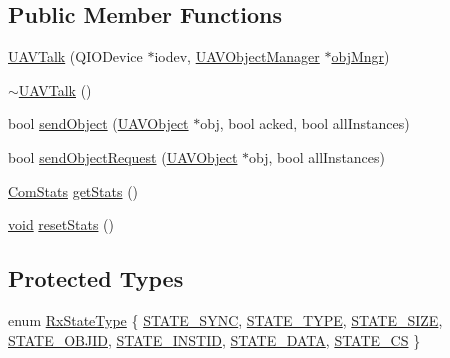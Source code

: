 \subsection*{\-Public \-Member \-Functions}
\begin{DoxyCompactItemize}
\item 
\hyperlink{group___u_a_v_talk_plugin_ga53c36c64288a62b44a285dfb40cee946}{\-U\-A\-V\-Talk} (\-Q\-I\-O\-Device $\ast$iodev, \hyperlink{class_u_a_v_object_manager}{\-U\-A\-V\-Object\-Manager} $\ast$\hyperlink{group___u_a_v_talk_plugin_ga096422f1ff46ea45de07a92c41827aa5}{obj\-Mngr})
\item 
\hyperlink{group___u_a_v_talk_plugin_ga1c6de05403ed728008c21592d142375e}{$\sim$\-U\-A\-V\-Talk} ()
\item 
bool \hyperlink{group___u_a_v_talk_plugin_gafb99b5df957808785013366dfd5bc636}{send\-Object} (\hyperlink{class_u_a_v_object}{\-U\-A\-V\-Object} $\ast$obj, bool acked, bool all\-Instances)
\item 
bool \hyperlink{group___u_a_v_talk_plugin_ga884c8680ea2c95bef75fca2c4c95867d}{send\-Object\-Request} (\hyperlink{class_u_a_v_object}{\-U\-A\-V\-Object} $\ast$obj, bool all\-Instances)
\item 
\hyperlink{struct_u_a_v_talk_1_1_com_stats}{\-Com\-Stats} \hyperlink{group___u_a_v_talk_plugin_gac9f7d49b556190b1b7d4b845b8b23a34}{get\-Stats} ()
\item 
\hyperlink{group___u_a_v_objects_plugin_ga444cf2ff3f0ecbe028adce838d373f5c}{void} \hyperlink{group___u_a_v_talk_plugin_gaba16247e0963a29b16a6177e685f1321}{reset\-Stats} ()
\end{DoxyCompactItemize}
\subsection*{\-Protected \-Types}
\begin{DoxyCompactItemize}
\item 
enum \hyperlink{group___u_a_v_talk_plugin_ga7f7ca2a64b0ea5ec26fb64d06bf9e09b}{\-Rx\-State\-Type} \{ \*
\hyperlink{group___u_a_v_talk_plugin_gga7f7ca2a64b0ea5ec26fb64d06bf9e09baf774a734f7889e634d5b363fa3f3c793}{\-S\-T\-A\-T\-E\-\_\-\-S\-Y\-N\-C}, 
\hyperlink{group___u_a_v_talk_plugin_gga7f7ca2a64b0ea5ec26fb64d06bf9e09baa1450012a1828440751fcb6f17ac250f}{\-S\-T\-A\-T\-E\-\_\-\-T\-Y\-P\-E}, 
\hyperlink{group___u_a_v_talk_plugin_gga7f7ca2a64b0ea5ec26fb64d06bf9e09ba3257c8699631219b720e0661955ef1f6}{\-S\-T\-A\-T\-E\-\_\-\-S\-I\-Z\-E}, 
\hyperlink{group___u_a_v_talk_plugin_gga7f7ca2a64b0ea5ec26fb64d06bf9e09ba14ae245b4bee65b20ff1be4e31396df4}{\-S\-T\-A\-T\-E\-\_\-\-O\-B\-J\-I\-D}, 
\*
\hyperlink{group___u_a_v_talk_plugin_gga7f7ca2a64b0ea5ec26fb64d06bf9e09baadc60771fcd506f0b9714cdb478ecb08}{\-S\-T\-A\-T\-E\-\_\-\-I\-N\-S\-T\-I\-D}, 
\hyperlink{group___u_a_v_talk_plugin_gga7f7ca2a64b0ea5ec26fb64d06bf9e09ba38e65dcea6f1e7c9e74726f3e2f0654b}{\-S\-T\-A\-T\-E\-\_\-\-D\-A\-T\-A}, 
\hyperlink{group___u_a_v_talk_plugin_gga7f7ca2a64b0ea5ec26fb64d06bf9e09baed576d42fef7f3e2488c61b3f64402d7}{\-S\-T\-A\-T\-E\-\_\-\-C\-S}
 \}
\end{DoxyCompactItemize}
